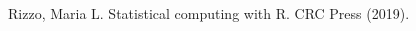 \documentclass[twoside,leqno,11pt]{article}
\begin{document}
\begin{thebibliography}{8}















\item 
Rizzo, Maria L. Statistical computing with R. CRC Press (2019).

\end{thebibliography}
\end{document}
